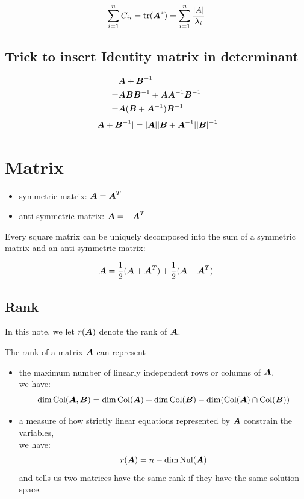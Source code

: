 \documentclass{overview}
\begin{document}
\[
	\sum_{i=1}^{n} C_{ii} =\operatorname{tr}(\boldsymbol{A}^{*}) =
	\sum_{i=1}^n\frac{|A|}{\lambda_i}
\] 
\subsection{Trick to insert Identity matrix in determinant}

\[
	\begin{aligned}
		&\boldsymbol{A}+\boldsymbol{B}^{-1} \\
		=&\boldsymbol{A}\boldsymbol{B}\boldsymbol{B}^{-1}+\boldsymbol{A}\boldsymbol{A}^{-1}\boldsymbol{B}^{-1}\\
		=&\boldsymbol{A}(\boldsymbol{B}+\boldsymbol{A}^{-1})\boldsymbol{B}^{-1} \\
	\end{aligned}
\] 
\[
	|\boldsymbol{A}+\boldsymbol{B}^{-1}| = |\boldsymbol{A}||\boldsymbol{B}+\boldsymbol{A}^{-1}||\boldsymbol{B}|^{-1}
\] 

\section{Matrix}

\begin{itemize}
	\item symmetric matrix: $\boldsymbol{A}=\boldsymbol{A}^T$
	\item anti-symmetric matrix: $\boldsymbol{A}=-\boldsymbol{A}^T$
\end{itemize}

Every square matrix can be uniquely decomposed into the sum of a symmetric
matrix and an anti-symmetric matrix:

\[
	\boldsymbol{A} = \frac{1}{2}(\boldsymbol{A}+\boldsymbol{A}^T) 
	+ \frac{1}{2}(\boldsymbol{A}-\boldsymbol{A}^T)
\] 

\subsection{Rank}

In this note, we let $r(\boldsymbol{A})$ denote the rank of $\boldsymbol{A}$.

The rank of a matrix $\boldsymbol{A}$ can represent 
\begin{itemize}
	\item the maximum number of linearly independent rows or columns of $\boldsymbol{A}$. \\
	we have:
		\[
			\dim\text{Col}(\boldsymbol{A}, \boldsymbol{B}) =
			\dim\text{Col}(\boldsymbol{A}) + \dim\text{Col}(\boldsymbol{B})
			- \dim(\text{Col}(\boldsymbol{A}) \cap \text{Col}(\boldsymbol{B}))
		\] 
	\item a measure of how strictly linear equations represented by $\boldsymbol{A}$ constrain the variables,\\
		we have:
		\[
			r(\boldsymbol{A}) = n - \dim \text{Nul}(\boldsymbol{A})
		\]
		and tells us two matrices have the same rank if they have the same solution space.

\end{itemize}
\end{document}
